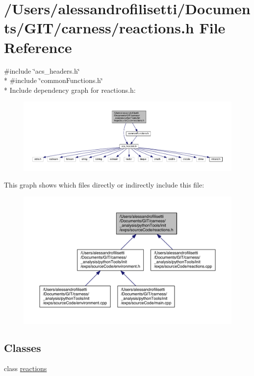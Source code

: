 \hypertarget{a00077}{\section{/\-Users/alessandrofilisetti/\-Documents/\-G\-I\-T/carness/reactions.h File Reference}
\label{a00077}
}
{\ttfamily \#include \char`\"{}acs\-\_\-headers.\-h\char`\"{}}\\*
{\ttfamily \#include \char`\"{}common\-Functions.\-h\char`\"{}}\\*
Include dependency graph for reactions.\-h\-:
\nopagebreak
\begin{figure}[H]
\begin{center}
\leavevmode
\includegraphics[width=350pt]{a00198}
\end{center}
\end{figure}
This graph shows which files directly or indirectly include this file\-:
\nopagebreak
\begin{figure}[H]
\begin{center}
\leavevmode
\includegraphics[width=350pt]{a00199}
\end{center}
\end{figure}
\subsection*{Classes}
\begin{DoxyCompactItemize}
\item 
class \hyperlink{a00021}{reactions}
\end{DoxyCompactItemize}
